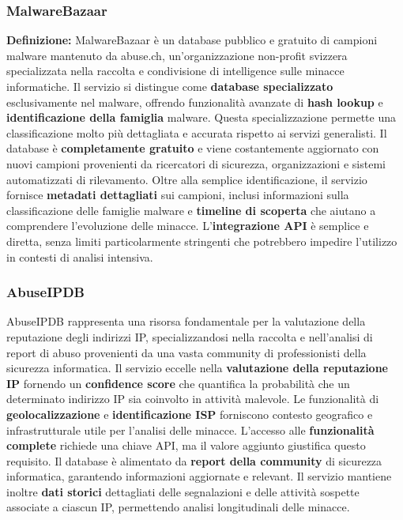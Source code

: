\documentclass{article}
\begin{document}
\subsubsection{MalwareBazaar}
\textbf{Definizione:} MalwareBazaar è un database pubblico e gratuito di campioni malware mantenuto da abuse.ch, un'organizzazione non-profit svizzera specializzata nella raccolta e condivisione di intelligence sulle minacce informatiche.
\newline \newline
Il servizio si distingue come \textbf{database specializzato} esclusivamente nel malware, offrendo funzionalità avanzate di \textbf{hash lookup} e \textbf{identificazione della famiglia} malware. Questa specializzazione permette una classificazione molto più dettagliata e accurata rispetto ai servizi generalisti.
\newline \newline
Il database è \textbf{completamente gratuito} e viene costantemente aggiornato con nuovi campioni provenienti da ricercatori di sicurezza, organizzazioni e sistemi automatizzati di rilevamento. Oltre alla semplice identificazione, il servizio fornisce \textbf{metadati dettagliati} sui campioni, inclusi informazioni sulla classificazione delle famiglie malware e \textbf{timeline di scoperta} che aiutano a comprendere l'evoluzione delle minacce.
\newline \newline
L'\textbf{integrazione API} è semplice e diretta, senza limiti particolarmente stringenti che potrebbero impedire l'utilizzo in contesti di analisi intensiva.

\subsubsection{AbuseIPDB}
AbuseIPDB rappresenta una risorsa fondamentale per la valutazione della reputazione degli indirizzi IP, specializzandosi nella raccolta e nell'analisi di report di abuso provenienti da una vasta community di professionisti della sicurezza informatica.
\newline \newline
Il servizio eccelle nella \textbf{valutazione della reputazione IP} fornendo un \textbf{confidence score} che quantifica la probabilità che un determinato indirizzo IP sia coinvolto in attività malevole. Le funzionalità di \textbf{geolocalizzazione} e \textbf{identificazione ISP} forniscono contesto geografico e infrastrutturale utile per l'analisi delle minacce.
\newline \newline
L'accesso alle \textbf{funzionalità complete} richiede una chiave API, ma il valore aggiunto giustifica questo requisito. Il database è alimentato da \textbf{report della community} di sicurezza informatica, garantendo informazioni aggiornate e relevant. Il servizio mantiene inoltre \textbf{dati storici} dettagliati delle segnalazioni e delle attività sospette associate a ciascun IP, permettendo analisi longitudinali delle minacce.
\newpage
\end{document}
